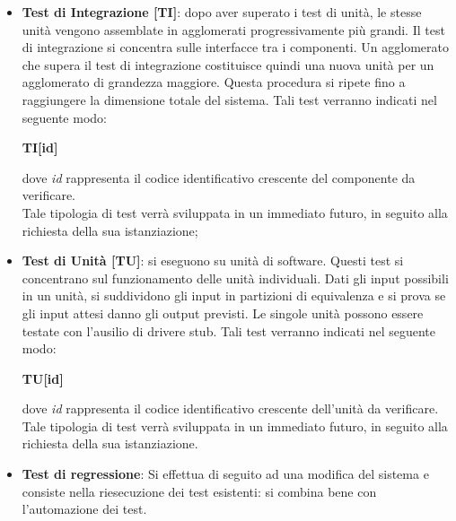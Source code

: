 {\begin{itemize}
			In questa fase ci si assicura che il sistema rispetti tutte le specifiche definite nell'\textit{Analisi dei Requisiti}. Tali test verranno indicati nel seguente modo:\\
			\centerline{\textbf{TS[id]}}
			dove \textit{id} rappresenta il codice identificativo crescente del componente da
			verificare.\\
			Tale tipologia di test verrà sviluppata in un immediato futuro, in seguito alla richiesta della sua istanziazione;
			\item \textbf{Test di Integrazione [TI]}: dopo aver superato i test di unità, le stesse unità vengono assemblate in agglomerati progressivamente più grandi. Il test di integrazione si concentra sulle interfacce tra i componenti. Un agglomerato che supera il test di integrazione costituisce quindi una nuova unità per un agglomerato di grandezza maggiore. Questa procedura si ripete fino a raggiungere la dimensione totale del sistema. Tali test verranno indicati nel seguente modo:\\
			\centerline{\textbf{TI[id]}}
			dove \textit{id} rappresenta il codice identificativo crescente del componente da
			verificare.\\
			Tale tipologia di test verrà sviluppata in un immediato futuro, in seguito alla richiesta della sua istanziazione;
			\item \textbf{Test di Unità [TU]}: si eseguono su unità di software. Questi test si concentrano sul funzionamento delle unità individuali. Dati gli input possibili in un unità, si suddividono gli input in partizioni di equivalenza e si prova se gli input attesi danno gli output previsti. Le singole unità possono essere testate con l'ausilio di driver\glosp e stub\glo. Tali test verranno indicati nel
			seguente modo:\\
			\centerline{\textbf{TU[id]}}
			dove \textit{id} rappresenta il codice identificativo crescente dell'unità da verificare.\\
			Tale tipologia di test verrà sviluppata in un immediato futuro, in seguito alla richiesta della sua istanziazione.
			\item \textbf{Test di regressione}: Si effettua di seguito ad una modifica del sistema e consiste nella riesecuzione dei test esistenti: si combina bene con l'automazione dei test.
		\end{itemize}
		
}

